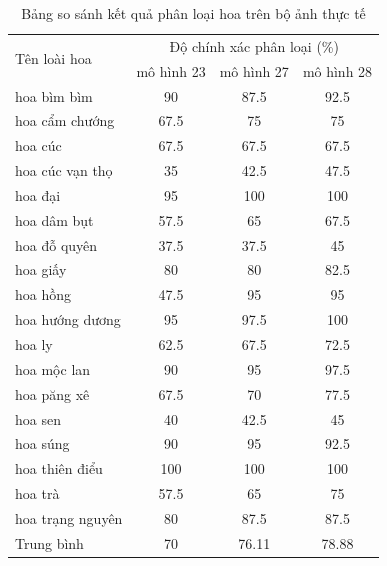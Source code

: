 \documentclass[12pt]{report}
\begin{document}
		\begin{table}
			\centering
			\caption{Bảng so sánh kết quả phân loại hoa trên bộ ảnh thực tế}
			\label{tbl:bang phan loai anh thuc te}
			\begin{tabular}{|l|c|c|c|}
			\hline
			\multirow{2}{*}{Tên loài hoa} & \multicolumn{3}{c|}{Độ chính xác phân loại (\%)} \\ \cline{2-4} 
						& mô hình 23     & mô hình 27     & mô hình 28     \\ \hline
			hoa bìm bìm                   & 90             & 87.5           & 92.5           \\ \hline
			hoa cẩm chướng                & 67.5           & 75             & 75             \\ \hline
			hoa cúc                       & 67.5           & 67.5           & 67.5           \\ \hline
			hoa cúc vạn thọ               & 35             & 42.5           & 47.5           \\ \hline
			hoa đại                       & 95             & 100            & 100            \\ \hline
			hoa dâm bụt                   & 57.5           & 65             & 67.5           \\ \hline
			hoa đỗ quyên                  & 37.5           & 37.5           & 45             \\ \hline
			hoa giấy                      & 80             & 80             & 82.5           \\ \hline
			hoa hồng                      & 47.5           & 95             & 95             \\ \hline
			hoa hướng dương               & 95             & 97.5           & 100            \\ \hline
			hoa ly                        & 62.5           & 67.5           & 72.5           \\ \hline
			hoa mộc lan                   & 90             & 95             & 97.5           \\ \hline
			hoa păng xê                   & 67.5           & 70             & 77.5           \\ \hline
			hoa sen                       & 40             & 42.5           & 45             \\ \hline
			hoa súng                      & 90             & 95             & 92.5           \\ \hline
			hoa thiên điểu                & 100            & 100            & 100            \\ \hline
			hoa trà                       & 57.5           & 65             & 75             \\ \hline
			hoa trạng nguyên              & 80             & 87.5           & 87.5           \\ \hline
			Trung bình                    & 70                     & 76.11                  & 78.88                  \\ \hline
		\end{tabular}
		\end{table}
\end{document}
